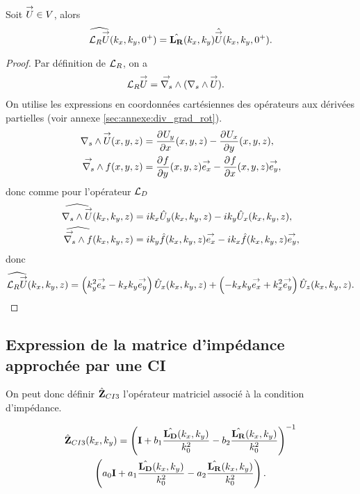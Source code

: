     \begin{prop}
      Soit \(\vect{U} \in V\), alors
      \begin{equation*}
        \widehat{\LR \vect{U}} (k_x,k_y,0^+) = \hat{\mLR}(k_x,k_y) \hat{\vect{U}}(k_x,k_y,0^+).
      \end{equation*}
    \end{prop}

    \begin{proof}
      Par définition de \(\LR\), on a
      \begin{align*}
        \LR \vect{U} & = \vrots{} (\rots{} \vect{U}).
      \end{align*}
      On utilise les expressions en coordonnées cartésiennes des opérateurs aux dérivées partielles (voir annexe \ref{sec:annexe:div_grad_rot}).
      \begin{align*}
        \rots{\vect{U}}(x,y,z) &= \ddr{x}{U_y}(x,y,z) - \ddr{y}{U_x}(x,y,z),
        \\
        \vrots{f}(x,y,z) &= \ddr{y}{f}(x,y,z)\vect{e_x} - \ddr{x}{f}(x,y,z)\vect{e_y},
      \end{align*}
      donc comme pour l'opérateur \(\LD\)
      \begin{align*}
        \widehat{\rots{\vect{U}}}(k_x,k_y,z) &= ik_x{\hat{U}_y}(k_x,k_y,z) - ik_y{\hat{U}_x}(k_x,k_y,z),
        \\
        \widehat{\vrots{f}}(k_x,k_y,z) &=  ik_y\hat{f}(k_x,k_y,z)\vect{e_x} - ik_x\hat{f}(k_x,k_y,z)\vect{e_y},
      \end{align*}
      donc
      \begin{align*}
        \widehat{\LR{\vect{U}}}(k_x,k_y,z) =  \left({k_y^2}\vect{e_x} -k_xk_y\vect{e_y}\right){\hat{U}_x}(k_x,k_y,z) + \left(-k_xk_y\vect{e_x} + k_x^2\vect{e_y}\right){\hat{U}_z}(k_x,k_y,z).
      \end{align*}
    \end{proof}

  \subsection{Expression de la matrice d'impédance approchée par une CI}

    On peut donc définir \(\hat{\mZ}_{CI3}\) l’opérateur matriciel associé à la condition d'impédance.

    \begin{multline}
      \label{eq:plan:hoibc:ci3}
      \hat{\mZ}_{CI3}(k_x,k_y) = \left(\mI + b_1 \frac{\hat{\mLD}(k_x,k_y)}{k_0^2} - b_2 \frac{\hat{\mLR}(k_x,k_y)}{k_0^2} \right)^{-1}\\\left(a_0 \mI + a_1 \frac{\hat{\mLD}(k_x,k_y)}{k_0^2} - a_2 \frac{\hat{\mLR}(k_x,k_y)}{k_0^2}\right).
    \end{multline}


